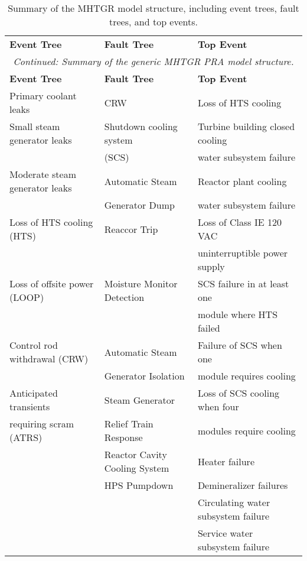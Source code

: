 \begin{longtable}{@{}lll@{}}
\small
\caption{Summary of the MHTGR model structure, including event trees, fault trees, and top events.}
\label{tab:mhtgr_dataset_summary}\\
\toprule
\textbf{Event Tree} & \textbf{Fault Tree} & \textbf{Top Event} \\* \midrule
\endfirsthead
\multicolumn{3}{c}{\textit{Continued: Summary of the generic MHTGR PRA model structure.}}\\
\toprule
\textbf{Event Tree} & \textbf{Fault Tree} & \textbf{Top Event} \\* \midrule
\endhead
\bottomrule
\endfoot
\endlastfoot

Primary coolant leaks & CRW & Loss of HTS cooling \\
Small steam generator leaks & Shutdown cooling system & Turbine building closed cooling\\
& (SCS) & water subsystem failure \\
Moderate steam generator leaks & Automatic Steam & Reactor plant cooling\\
& Generator Dump & water subsystem failure \\
Loss of HTS cooling (HTS) & Reaccor Trip & Loss of Class IE 120 VAC\\
& & uninterruptible power supply \\
Loss of offsite power (LOOP) & Moisture Monitor Detection & SCS failure in at least one\\
& & module where HTS failed \\
Control rod withdrawal (CRW) & Automatic Steam & Failure of SCS when one\\
& Generator Isolation & module requires cooling \\
Anticipated transients & Steam Generator & Loss of SCS cooling when four\\
requiring scram (ATRS) & Relief Train Response & modules require cooling \\
& Reactor Cavity Cooling System & Heater failure \\
& HPS Pumpdown & Demineralizer failures \\
& & Circulating water subsystem failure \\
& & Service water subsystem failure \\
\bottomrule
\end{longtable}